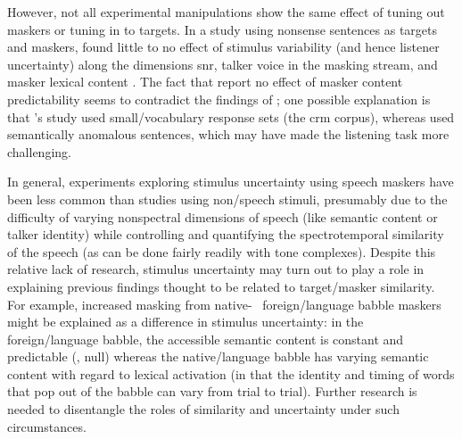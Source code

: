 However, not all experimental manipulations show the same effect of tuning out maskers or tuning in to targets.  In a study using nonsense sentences as targets and maskers, \citeauthor*{FreymanEtAl2007} found little to no effect of stimulus variability (and hence listener uncertainty) along the dimensions \ac{snr}, talker voice in the masking stream, and masker lexical content \citep{FreymanEtAl2007}.  The fact that \citeauthor*{FreymanEtAl2007} report no effect of masker content predictability seems to contradict the findings of \citet{BrungartSimpson2004}; one possible explanation is that \citeauthor*{BrungartSimpson2004}’s study used small\-/vocabulary response sets (the \ac{crm} corpus), whereas \citeauthor*{FreymanEtAl2007} used semantically anomalous sentences, which may have made the listening task more challenging.  

In general, experiments exploring stimulus uncertainty using speech maskers have been less common than studies using non\-/speech stimuli, presumably due to the difficulty of varying nonspectral dimensions of speech (like semantic content or talker identity) while controlling and quantifying the spectrotemporal similarity of the speech (as can be done fairly readily with tone complexes).  Despite this relative lack of research, stimulus uncertainty may turn out to play a role in explaining previous findings thought to be related to target\-/masker similarity.  For example, increased masking from native- \vs\ foreign\-/language babble maskers \citep[\eg,][]{RhebergenEtAl2005, GarciaLecumberriCooke2006, VanEngenBradlow2007, BrouwerEtAl2012} might be explained as a difference in stimulus uncertainty: in the foreign\-/language babble, the accessible semantic content is constant and predictable (\ie, null) whereas the native\-/language babble has varying semantic content with regard to lexical activation (in that the identity and timing of words that pop out of the babble can vary from trial to trial).  Further research is needed to disentangle the roles of similarity and uncertainty under such circumstances.  %


